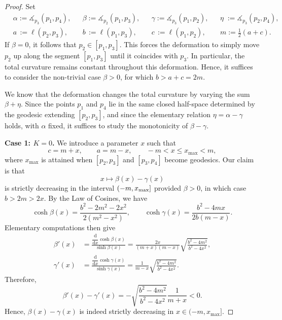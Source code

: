\documentclass[hidelinks,12pt,a4paper]{article}
\numberwithin{equation}{section}
\theoremstyle{plain}
\theoremstyle{definition}
\newcommand{\ma}{\ensuremath{\measuredangle}}
\begin{document}
\begin{proof}
Set
\begin{equation*}
\begin{aligned}
&\alpha:=\ma_{p_3}(p_1,p_4),
&&\beta:=\ma_{p_2}(p_1,p_3),
&&\gamma:=\ma_{p_3}(p_1,p_2),
&&\eta\;:=\ma_{p_3}(p_2,p_4),\\
&a\,:=\ell(p_2,p_3), &&b\,:=\ell(p_1,p_3), &&c\,:=\ell(p_1,p_2),&&m:=\tfrac{1}{2}(a+c).
\end{aligned}
\end{equation*}
If $\beta = 0$, it follows that $p_2 \in [p_1,p_3]$. 
This forces the deformation to simply move $p_2$ up along the segment $[p_1,p_3]$ until it coincides with $p_3$. 
In particular, the total curvature remains constant throughout this deformation. 
Hence, it suffices to consider the non-trivial case $\beta > 0$, for which $b > a+c = 2m$.

We know that the deformation changes the total curvature by varying the sum $\beta+\eta$. 
Since the points $p_1$ and $p_4$ lie in the same closed half-space determined by the geodesic extending $[p_2,p_3]$, and since the elementary relation $\eta=\alpha-\gamma$ holds, with $\alpha$ fixed, it suffices to study the monotonicity of $\beta-\gamma$. 

\medskip
\noindent
\textbf{Case 1: $K=0$.}
We introduce a parameter $x$ such that
\begin{equation*}
c=m+x,\qquad a=m-x,\qquad -m< x\leq x_{\mathrm{max}}< m,
\end{equation*}
where $x_{\max}$ is attained when $[p_2,p_3]$ and $[p_3,p_4]$ become geodesics. Our claim is that
\begin{equation*}
x \mapsto \beta(x) - \gamma(x)
\end{equation*}
is strictly decreasing in the interval $(-m, x_{\textnormal{max}}]$ provided $\beta >0$, in which case $b>2m>2x$.
By the Law of Cosines, we have
\begin{equation*}
\cosh\beta(x) = \frac{b^2-2m^2-2x^2}{2(m^2-x^2)},\qquad \cosh\gamma(x) = \frac{b^2-4mx}{2b(m-x)}.
\end{equation*}
Elementary computations then give 
\begin{equation*}
\begin{aligned}
\beta'(x)&=\frac{\dfrac{\mathrm{d}}{\mathrm{d}x}\cosh\beta(x)}{\sinh\beta(x)}=
\frac{2x}{(m+x)(m-x)}\sqrt{\frac{b^2-4m^2}{b^2-4x^2}},\\
\gamma'(x)&=\frac{\dfrac{\mathrm{d}}{\mathrm{d}x}\cosh\gamma(x)}{\sinh\gamma(x)}=\frac{1}{m-x}\sqrt{\frac{b^2-4m^2}{b^2-4x^2}}.
\end{aligned}
\end{equation*}
Therefore,
\[
\beta'(x)-\gamma'(x)
=-\sqrt{\frac{b^2-4m^2}{b^2-4x^2}}
\frac{1}{m+x}< 0.
\]
Hence, $\beta(x) - \gamma(x)$ is indeed strictly decreasing in $x\in (-m,x_{\mathrm{max}}]$.


\end{proof}
\end{document}
